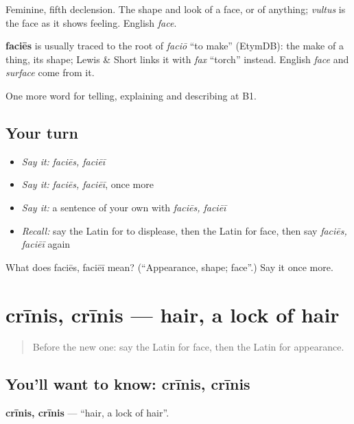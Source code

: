 Feminine, fifth declension. The shape and look of a face, or of anything; \emph{vultus} is the face as it shows feeling. English \emph{face}.

\begin{cousinweb}
\textbf{faciēs} is usually traced to the root of \emph{faciō} \textquotedblleft{}to make\textquotedblright{} (EtymDB): the make of a thing, its shape; Lewis \& Short links it with \emph{fax} \textquotedblleft{}torch\textquotedblright{} instead. English \emph{face} and \emph{surface} come from it.
\end{cousinweb}

\begin{grammarlens}[title={What you've built}]
One more word for telling, explaining and describing at B1.
\end{grammarlens}

\subsection*{Your turn}
\begin{itemize}
\raggedright
  \item \emph{Say it:} \emph{faciēs, faciēī}
  \item \emph{Say it:} \emph{faciēs, faciēī}, once more
  \item \emph{Say it:} a sentence of your own with \emph{faciēs, faciēī}
  \item \emph{Recall:} say the Latin for to displease, then the Latin for face, then say \emph{faciēs, faciēī} again
\end{itemize}

\begin{tcolorbox}[breakable,colback=teal!4,colframe=teal!35!black,title={Before you move on}]
What does faciēs, faciēī mean? (\textquotedblleft{}Appearance, shape; face\textquotedblright{}.) Say it once more.
\end{tcolorbox}
\section[crīnis, crīnis]{crīnis, crīnis — hair, a lock of hair}

\label{lesson:LA-C515-crinis}



\begin{quote}
Before the new one: say the Latin for face, then the Latin for appearance.
\end{quote}

\subsection*{You'll want to know: crīnis, crīnis}
\textbf{crīnis, crīnis} — \textquotedblleft{}hair, a lock of hair\textquotedblright{}.

